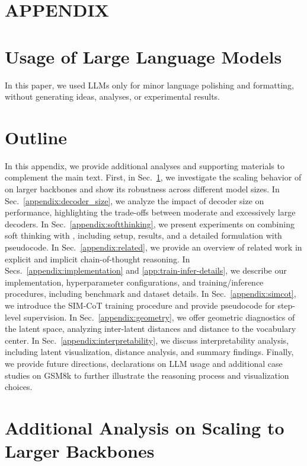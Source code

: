 \appendix
\newpage
\section*{\centering APPENDIX}

\section*{Usage of Large Language Models}
In this paper, we used LLMs only for minor language polishing and formatting, without generating ideas, analyses, or experimental results.

\section*{Outline}
In this appendix, we provide additional analyses and supporting materials to complement the main text.  
First, in Sec.~\ref{appendix:scaling_backbones}, we investigate the scaling behavior of \methodname on larger backbones and show its robustness across different model sizes.  
In Sec.~\ref{appendix:decoder_size}, we analyze the impact of decoder size on performance, highlighting the trade-offs between moderate and excessively large decoders.  
In Sec.~\ref{appendix:softthinking}, we present experiments on combining soft thinking with \methodname, including setup, results, and a detailed formulation with pseudocode.  
In Sec.~\ref{appendix:related}, we provide an overview of related work in explicit and implicit chain-of-thought reasoning.  
In Secs.~\ref{appendix:implementation} and \ref{app:train-infer-details}, we describe our implementation, hyperparameter configurations, and training/inference procedures, including benchmark and dataset details.  
In Sec.~\ref{appendix:simcot}, we introduce the SIM-CoT training procedure and provide pseudocode for step-level supervision.  
In Sec.~\ref{appendix:geometry}, we offer geometric diagnostics of the latent space, analyzing inter-latent distances and distance to the vocabulary center.  
In Sec.~\ref{appendix:interpretability}, we discuss interpretability analysis, including latent visualization, distance analysis, and summary findings.  
Finally, we provide future directions, declarations on LLM usage and additional case studies on GSM8k to further illustrate the reasoning process and visualization choices.


\section{Additional Analysis on Scaling to Larger Backbones}
\label{appendix:scaling_backbones}

